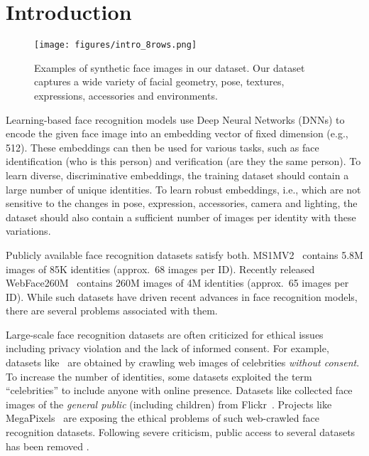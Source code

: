 \documentclass[10pt,twocolumn,letterpaper]{article}
\begin{document}
\section{Introduction}
\label{sec:introduction}

\begin{figure*}[t]
\begin{center}
\texttt{[image: figures/intro\_8rows.png]}
\end{center}
\caption{Examples of synthetic face images in our dataset. Our dataset captures a wide variety of facial geometry, pose, textures, expressions, accessories and environments.}
\label{fig:intro}
\end{figure*}

Learning-based face recognition models \cite{2015_FR_facenet,2017_FR_SphereFace,2018_FR_CosFace,2018_FR_SV-AM-Softmax,2019_FR_ArcFace,2020_FR_curricularface,2021_FR_magface,2022_FR_adaface} use Deep Neural Networks (DNNs) to encode the given face image into an embedding vector of fixed dimension (e.g., 512). These embeddings can then be used for various tasks, such as face identification (who is this person) and verification (are they the same person). To learn diverse, discriminative embeddings, the training dataset should contain a large number of unique identities. To learn robust embeddings, i.e., which are not sensitive to the changes in pose, expression, accessories, camera and lighting, the dataset should also contain a sufficient number of images per identity with these variations.

Publicly available face recognition datasets satisfy both. MS1MV2~\cite{2019_FR_ArcFace} contains 5.8M images of 85K identities (approx.~68 images per ID). 
Recently released WebFace260M~\cite{2021_FRD_webface260m} contains 260M images of 4M identities (approx.~65 images per ID). 
While such datasets have driven recent advances in face recognition models, there are several problems associated with them.

Large-scale face recognition datasets are often criticized for ethical issues including privacy violation and the lack of informed consent. For example, datasets like~\cite{2014_FRD_casiawebface,2016_FRD_ms1m,2019_FR_ArcFace,2021_FRD_webface260m} are obtained by crawling web images of celebrities \textit{without consent}. To increase the number of identities, some datasets exploited the term ``celebrities'' to include anyone with online presence. Datasets like \cite{2016_FRD_megafacev1,2017_FRD_megafacev2} collected face images of the \textit{general public} (including children) from Flickr~\cite{flickr}. Projects like MegaPixels~\cite{megapixels} are exposing the ethical problems of such web-crawled face recognition datasets. Following severe criticism, public access to several datasets has been removed \cite{nature_article}.
\end{document}
